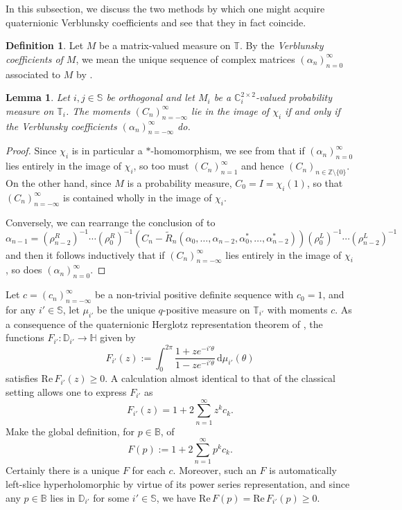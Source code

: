 \documentclass[11pt,reqno]{amsart}
\def\a{\alpha}
\def\x{\chi}
\def\r{\rho}
\def\th{\theta}
\def\rmd{\mathrm{d}}
\def\ZZ{\mathbb{Z}}
\def\CC{\mathbb{C}}
\def\DD{\mathbb{D}}
\def\BB{\mathbb{B}}
\def\SS{\mathbb{S}}
\def\TT{\mathbb{T}}
\def\HH{\mathbb{H}}
\newtheorem{lemma}[theorem]{Lemma}
\theoremstyle{definition}
\newtheorem{definition}[theorem]{Definition}
\numberwithin{equation}{section}
\renewcommand{\tilde}{\widetilde}
\renewcommand{\Re}{\mathrm{Re}\,}
\begin{document}
In this subsection, we discuss the two methods by which one might acquire quaternionic Verblunsky coefficients and see that they in fact coincide.

\begin{definition}
    Let \(M\) be a matrix-valued measure on \(\TT\). By the \emph{Verblunsky coefficients of \(M\)}, we mean the unique sequence of complex matrices \((\a_n)_{n=0}^{\infty}\) associated to \(M\) by \cite[Theorem 3.12]{DPS08}.
\end{definition}

\begin{lemma}
\label{lem:ImageOfXi}
    Let \(i,j \in \SS\) be orthogonal and let \(M_i\) be a \(\CC_i^{2\times2}\)-valued probability measure on \(\TT_i\). The moments \((C_n)_{n=-\infty}^{\infty}\) lie in the image of \(\x_i\) if and only if the Verblunsky coefficients \((\a_n)_{n=-\infty}^{\infty}\) do.
\end{lemma}
\begin{proof}
    Since \(\x_i\) is in particular a \(*\)-homomorphism, we see from  that if \((\a_n)_{n=0}^{\infty}\) lies entirely in the image of \(\x_i\), so too must \((C_n)_{n = 1}^{\infty}\) and hence \((C_n)_{n\in\ZZ\setminus\{0\}}\). On the other hand, since \(M\) is a probability measure, \(C_0 = I = \x_i(1)\), so that \((C_n)_{n=-\infty}^{\infty}\) is contained wholly in the image of \(\x_i\).

    Conversely, we can rearrange the conclusion of  to
    \[
        \a_{n-1} = (\r_{n-2}^R)^{-1} \cdots (\r_0^R)^{-1} \left(C_n - \tilde{R}_n(\a_0, \ldots, \a_{n-2}, \a_0^*, \ldots, \a_{n-2}^*)\right) (\r_0^L)^{-1} \cdots (\r_{n-2}^L)^{-1}
    \]
    and then it follows inductively that if \((C_n)_{n=-\infty}^{\infty}\) lies entirely in the image of \(\x_i\), so does \((\a_n)_{n=0}^{\infty}\).
\end{proof}

Let \(c = (c_n)_{n=-\infty}^{\infty}\) be a non-trivial positive definite sequence with \(c_0 = 1\), and for any \(i' \in \SS\), let \(\mu_{i'}\) be the unique \(q\)-positive measure on \(\TT_{i'}\) with moments \(c\). As a consequence of the quaternionic Herglotz representation theorem of \cite{ACKS15}, the functions \(F_{i'} : \DD_{i'} \to \HH\) given by
\[
    F_{i'}(z) := \int_{0}^{2\pi} \frac{1 + ze^{-i'\th}}{1 - ze^{-i'\th}} \, \rmd\mu_{i'}(\th)
\]
satisfies \(\Re F_{i'}(z) \geq 0\). A calculation almost identical to that of the classical setting allows one to express \(F_{i'}\) as
\[
    F_{i'}(z) = 1 + 2 \sum_{n=1}^{\infty} z^k c_k.
\]
Make the global definition, for \(p \in \BB\), of
\[
    F(p) := 1 + 2 \sum_{n=1}^{\infty} p^k c_k.
\]
Certainly there is a unique \(F\) for each \(c\). Moreover, such an \(F\) is automatically left-slice hyperholomorphic by virtue of its power series representation, and since any \(p \in \BB\) lies in \(\DD_{i'}\) for some \(i' \in \SS\), we have \(\Re F(p) = \Re F_{i'}(p) \geq 0\). 
\end{document}
